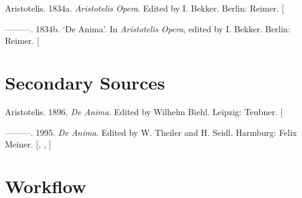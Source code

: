 \documentclass[
  12pt,
  a4paper,
  oneside,
  titlepage,
  toclink=all,
  toc=bibliography]{scrbook}
\newlength{\cslhangindent}
\newlength{\cslentryspacingunit} %
\newenvironment{CSLReferences}[2] %
 {%
  \setlength{\parindent}{0pt}
  \ifodd #1
  \let\oldpar\par
  \def\par{\hangindent=\cslhangindent\oldpar}
  \fi
  \setlength{\parskip}{#2\cslentryspacingunit}
 }%
 {}
\theoremstyle{plain}
\theoremstyle{plain}
\theoremstyle{definition}
\theoremstyle{definition}
\theoremstyle{plain}
\theoremstyle{plain}
\theoremstyle{plain}
\theoremstyle{definition}
\theoremstyle{remark}
\begin{document}
\hypertarget{refs_scriv206}{}
\begin{CSLReferences}{1}{0}
\leavevmode{}%
Aristotelis. 1834a. \emph{Aristotelis Opera}. Edited by I. Bekker.
Berlin: Reimer. {[}\Acrobatmenu{GoBack}{$\hookleftarrow$}{]}

\leavevmode{}%
---------. 1834b. {`De Anima'}. In \emph{Aristotelis Opera}, edited by
I. Bekker. Berlin: Reimer. {[}\Acrobatmenu{GoBack}{$\hookleftarrow$}{]}

\end{CSLReferences}

\hypertarget{sec-scriv207}{%
\chapter{Secondary Sources}\label{sec-scriv207}}

\hypertarget{refs_scriv207}{}
\begin{CSLReferences}{1}{0}
\leavevmode{}%
Aristotelis. 1896. \emph{De Anima}. Edited by Wilhelm Biehl. Leipzig:
Teubner. {[}\Acrobatmenu{GoBack}{$\hookleftarrow$}{]}

\leavevmode{}%
---------. 1995. \emph{De Anima}. Edited by W. Theiler and H. Seidl.
Harmburg: Felix Meiner. {[},
\protect\hyperlink{cite_60}{\pageref{cite_60}},
\protect\hyperlink{cite_61}{\pageref{cite_61}}{]}

\end{CSLReferences}

\hypertarget{sec-scriv208}{%
\chapter{Workflow}\label{sec-scriv208}}
\end{document}
